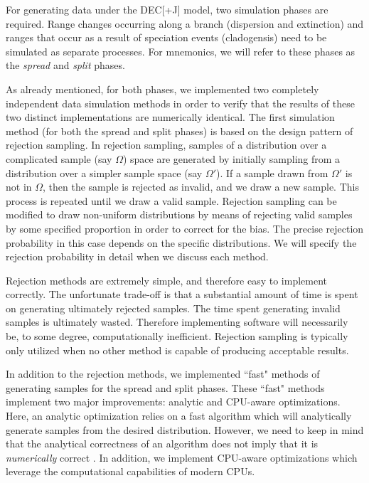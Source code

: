 \documentclass[a4paper]{article}
\begin{document}
For generating data under the DEC[+J] model, two simulation phases are required. 
Range changes occurring along a branch (dispersion and extinction) and ranges that occur as a result of speciation events (cladogensis) need to be simulated as separate processes.
For mnemonics, we will refer to these phases as the \textit{spread} and \textit{split} phases.

As already mentioned, for both phases, we implemented two completely independent data simulation methods in order to verify that the
results of these two distinct implementations are numerically identical. 
The first simulation method (for both the spread and split phases) is based on the design pattern of rejection
sampling.
In rejection sampling, samples of a distribution over a complicated sample (say $\Omega$) space are generated by
initially sampling from a distribution over a simpler sample space (say $\Omega'$). 
If a sample drawn from $\Omega'$ is not in $\Omega$, then the sample is rejected as invalid, and we draw a new sample.
This process is repeated until we draw a valid sample\footnotemark.
Rejection sampling can be modified to draw non-uniform distributions by means of rejecting valid samples
by some specified proportion in order to correct for the bias.
The precise rejection probability in this case depends on the specific distributions. 
We will specify the rejection probability in detail when we discuss each method.


Rejection methods are extremely simple, and therefore easy to implement correctly.
The unfortunate trade-off is that a substantial amount of time is spent on generating ultimately rejected samples. 
The time spent generating invalid samples is ultimately wasted.
Therefore implementing software will necessarily be, to some degree, computationally inefficient.
Rejection sampling is typically only utilized when no other method is capable of producing acceptable results.

In addition to the rejection methods, we implemented ``fast" methods of generating samples for the spread and split phases.
These ``fast" methods implement two major improvements: analytic and CPU-aware optimizations.
Here, an analytic optimization relies on a fast algorithm which will analytically generate samples from the desired distribution.
However, we need to keep in mind that the analytical correctness of an algorithm does not imply that it is \textit{numerically} correct
\cite{goldberg_what_1991, noauthor_ieee_1985}.
In addition, we implement CPU-aware optimizations which leverage the computational capabilities of modern CPUs.
\end{document}
